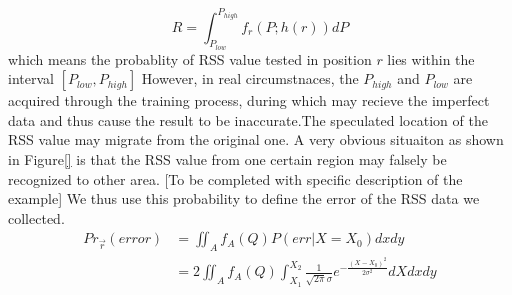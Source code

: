\documentclass[10pt,conference,compsocconf,letterpaper]{IEEEtran}
\begin{document}
\begin{equation}
R = \int_{{P_{low}}}^{{P_{high}}} {{f_r}(P;h(r))dP }
\end{equation}
which means the probablity of RSS value tested in position $r$ lies within the interval $[P_{low},P_{high}]$
However, in real circumstnaces, the $P_{high}$ and $P_{low}$ are acquired through the training process, during which may recieve the imperfect data and thus cause the result to be inaccurate.The speculated location of the RSS value may migrate from the original one.  A very obvious situaiton as shown in Figure\ref{} is that the RSS value from one certain region may falsely be recognized to other area. 
[To be completed with specific description of the example]
We thus use this probability to define the error of the RSS data we collected.
\begin{equation}
\begin{aligned}
Pr_{\vec r}(error) &= \iint_A {{f_A}}(Q)P(err|X = {X_0})dxdy\\
&= 2\iint_A {{f_A}}(Q)\int_{{X_1}}^{{X_2}} {\frac{1}{{\sqrt {2\pi } \sigma }}{e^{ - \frac{{{{(X - {X_0})}^2}}}{{2{\sigma ^2}}}}}} dXdxdy
\end{aligned}
\end{equation}
\end{document}
